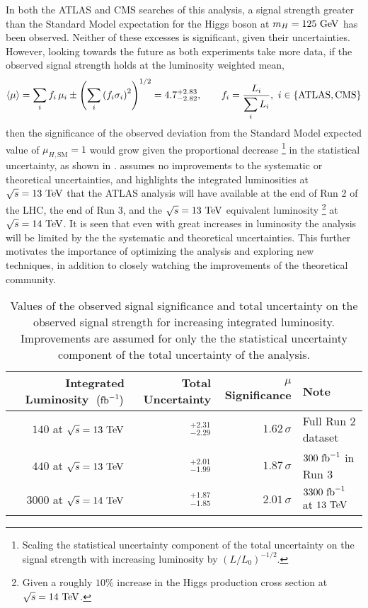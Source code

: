 In both the ATLAS and CMS searches of this analysis, a signal strength greater than the Standard Model expectation for the Higgs boson at $m_{H} = 125~\mathrm{GeV}$ has been observed.
Neither of these excesses is significant, given their uncertainties.
However, looking towards the future as both experiments take more data, if the observed signal strength holds at the luminosity weighted mean,
\[
 \braket{\mu} = \sum_{i} f_{i}\,\mu_{i} \pm \left(\sum_{i} \left(f_{i}\sigma_{i}\right)^{2}\right)^{1/2} = 4.7_{-2.82}^{+2.83}, \qquad f_{i} = \frac{L_{i}}{\displaystyle\sum_{i}L_{i}},~i \in \left\{\textrm{ATLAS}, \textrm{CMS}\right\}
\]
then the significance of the observed deviation from the Standard Model expected value of $\mu_{H, \textrm{SM}}=1$ would grow given the proportional decrease%
\footnote{Scaling the statistical uncertainty component of the total uncertainty on the signal strength with increasing luminosity by $\left(L/L_{0}\right)^{-1/2}$.}
in the statistical uncertainty, as shown in .
 assumes no improvements to the systematic or theoretical uncertainties, and highlights the integrated luminosities at $\sqrt{s}=13~\mathrm{TeV}$ that the ATLAS analysis will have available at the end of Run 2 of the LHC, the end of Run 3, and the $\sqrt{s}=13~\mathrm{TeV}$ equivalent luminosity%
\footnote{Given a roughly $10\%$ increase in the Higgs production cross section at $\sqrt{s}=14~\mathrm{TeV}$.}
at $\sqrt{s}=14~\mathrm{TeV}$.
It is seen that even with great increases in luminosity the analysis will be limited by the the systematic and theoretical uncertainties.
This further motivates the importance of optimizing the analysis and exploring new techniques, in addition to closely watching the improvements of the theoretical community.

\begin{table}[htbp]
 \centering
 \caption[Values of the observed signal significance and total uncertainty on the observed signal strength for increasing integrated luminosity.]{%
  Values of the observed signal significance and total uncertainty on the observed signal strength for increasing integrated luminosity.
  Improvements are assumed for only the the statistical uncertainty component of the total uncertainty of the analysis.}
 \label{table:signal_significance_lumi_scaling}
 \begin{tabular}{@{}rrrl@{}} \toprule
  Integrated Luminosity~$\left(\mathrm{fb}^{-1}\right)$ & Total Uncertainty  & $\mu$ Significance & Note                     \\ \midrule
  $140$ at $\sqrt{s}=13~\mathrm{TeV}$               & $_{-2.29}^{+2.31}$ & $1.62\,\sigma$     & Full Run 2 dataset       \\
  $440$ at $\sqrt{s}=13~\mathrm{TeV}$               & $_{-1.99}^{+2.01}$ & $1.87\,\sigma$     & $300~\mathrm{fb}^{-1}$ in Run 3      \\
  $3000$ at $\sqrt{s}=14~\mathrm{TeV}$              & $_{-1.85}^{+1.87}$ & $2.01\,\sigma$     & $3300~\mathrm{fb}^{-1}$ at $13~\mathrm{TeV}$ \\
  \bottomrule
 \end{tabular}
\end{table}

